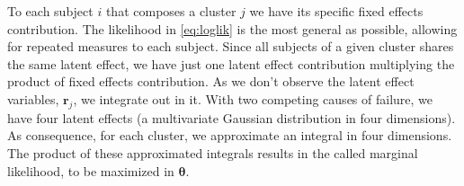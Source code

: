 To each subject \(i\) that composes a cluster \(j\) we have its specific
fixed effects contribution. The likelihood in \autoref{eq:loglik} is the
most general as possible, allowing for repeated measures to each
subject. Since all subjects of a given cluster shares the same latent
effect, we have just one latent effect contribution multiplying the
product of fixed effects contribution. As we don't observe the latent
effect variables, \(\bm{r}_{j}\), we integrate out in it. With two
competing causes of failure, we have four latent effects (a multivariate
Gaussian distribution in four dimensions). As consequence, for each
cluster, we approximate an integral in four dimensions. The product of
these approximated integrals results in the called marginal likelihood,
to be maximized in \(\bm{\theta}\).

